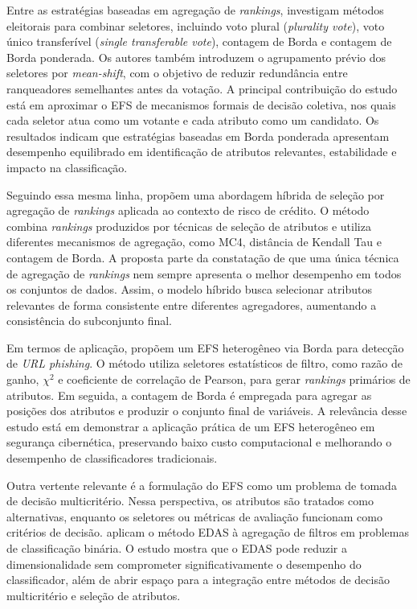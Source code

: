 Entre as estratégias baseadas em agregação de \textit{rankings},  investigam métodos eleitorais para combinar seletores, incluindo voto plural (\textit{plurality vote}), voto único transferível (\textit{single transferable vote}), contagem de Borda e contagem de Borda ponderada. Os autores também introduzem o agrupamento prévio dos seletores por \textit{mean-shift}, com o objetivo de reduzir redundância entre ranqueadores semelhantes antes da votação. A principal contribuição do estudo está em aproximar o EFS de mecanismos formais de decisão coletiva, nos quais cada seletor atua como um votante e cada atributo como um candidato. Os resultados indicam que estratégias baseadas em Borda ponderada apresentam desempenho equilibrado em identificação de atributos relevantes, estabilidade e impacto na classificação.

Seguindo essa mesma linha,  propõem uma abordagem híbrida de seleção por agregação de \textit{rankings} aplicada ao contexto de risco de crédito. O método combina \textit{rankings} produzidos por técnicas de seleção de atributos e utiliza diferentes mecanismos de agregação, como MC4, distância de Kendall Tau e contagem de Borda. A proposta parte da constatação de que uma única técnica de agregação de \textit{rankings} nem sempre apresenta o melhor desempenho em todos os conjuntos de dados. Assim, o modelo híbrido busca selecionar atributos relevantes de forma consistente entre diferentes agregadores, aumentando a consistência do subconjunto final.

Em termos de aplicação,  propõem um EFS heterogêneo via Borda para detecção de \textit{URL phishing}. O método utiliza seletores estatísticos de filtro, como razão de ganho, $\chi^2$ e coeficiente de correlação de Pearson, para gerar \textit{rankings} primários de atributos. Em seguida, a contagem de Borda é empregada para agregar as posições dos atributos e produzir o conjunto final de variáveis. A relevância desse estudo está em demonstrar a aplicação prática de um EFS heterogêneo em segurança cibernética, preservando baixo custo computacional e melhorando o desempenho de classificadores tradicionais.

Outra vertente relevante é a formulação do EFS como um problema de tomada de decisão multicritério. Nessa perspectiva, os atributos são tratados como alternativas, enquanto os seletores ou métricas de avaliação funcionam como critérios de decisão.  aplicam o método EDAS à agregação de filtros em problemas de classificação binária. O estudo mostra que o EDAS pode reduzir a dimensionalidade sem comprometer significativamente o desempenho do classificador, além de abrir espaço para a integração entre métodos de decisão multicritério e seleção de atributos.

